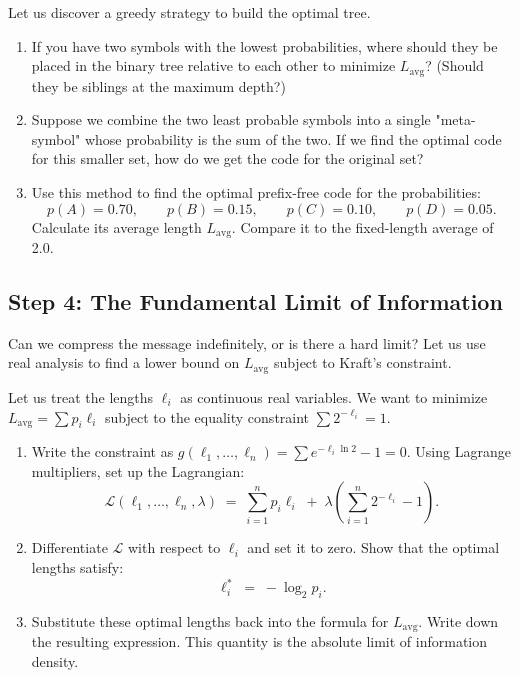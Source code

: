 \begin{problem}
Let us discover a greedy strategy to build the optimal tree.
\begin{enumerate}[label=(\alph*), topsep=2pt]
  \item If you have two symbols with the lowest probabilities, where should they be placed in the binary tree relative to each other to minimize $L_{\text{avg}}$? (Should they be siblings at the maximum depth?)
  \item Suppose we combine the two least probable symbols into a single "meta-symbol" whose probability is the sum of the two. If we find the optimal code for this smaller set, how do we get the code for the original set?
  \item Use this method to find the optimal prefix-free code for the probabilities:
  \[
    p(A) = 0.70, \qquad p(B) = 0.15, \qquad p(C) = 0.10, \qquad p(D) = 0.05.
  \]
  Calculate its average length $L_{\text{avg}}$. Compare it to the fixed-length average of 2.0.
\end{enumerate}
\end{problem}

\subsection{Step 4: The Fundamental Limit of Information}

Can we compress the message indefinitely, or is there a hard limit? Let us use real analysis to find a lower bound on $L_{\text{avg}}$ subject to Kraft's constraint.

\begin{problem}
Let us treat the lengths $\ell_i$ as continuous real variables. We want to minimize $L_{\text{avg}} = \sum p_i \ell_i$ subject to the equality constraint $\sum 2^{-\ell_i} = 1$.
\begin{enumerate}[label=(\alph*), topsep=2pt]
  \item Write the constraint as $g(\ell_1, \ldots, \ell_n) = \sum e^{-\ell_i \ln 2} - 1 = 0$. Using Lagrange multipliers, set up the Lagrangian:
  \[
    \mathcal{L}(\ell_1, \ldots, \ell_n, \lambda) \;=\; \sum_{i=1}^n p_i \ell_i \;+\; \lambda \left(\sum_{i=1}^n 2^{-\ell_i} - 1\right).
  \]

  \item Differentiate $\mathcal{L}$ with respect to $\ell_i$ and set it to zero. Show that the optimal lengths satisfy:
  \[
    \ell_i^* \;=\; -\log_2 p_i.
  \]
  \item Substitute these optimal lengths back into the formula for $L_{\text{avg}}$. Write down the resulting expression. This quantity is the absolute limit of information density.
\end{enumerate}
\end{problem}

